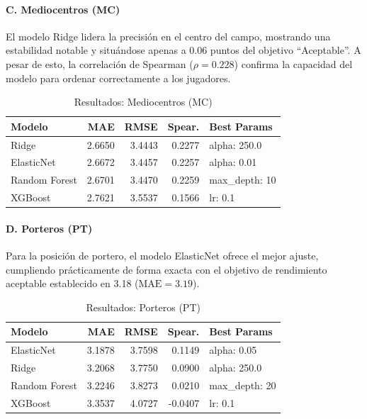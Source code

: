 \paragraph{C. Mediocentros (MC)}

El modelo Ridge lidera la precisión en el centro del campo, 
mostrando una estabilidad notable y situándose apenas a 0.06 
puntos del objetivo ``Aceptable''. A pesar de esto, la correlación 
de Spearman ($\rho = 0.228$) confirma la capacidad del modelo 
para ordenar correctamente a los jugadores.

\begin{table}[H]
\centering
\small
\begin{tabular}{|l|r|r|r|p{3cm}|}
\hline
\textbf{Modelo} & \textbf{MAE} & \textbf{RMSE} & \textbf{Spear.} & 
\textbf{Best Params} \\
\hline
Ridge & 2.6650 & 3.4443 & 0.2277 & alpha: 250.0 \\
ElasticNet & 2.6672 & 3.4457 & 0.2257 & alpha: 0.01 \\
Random Forest & 2.6701 & 3.4470 & 0.2259 & max\_depth: 10 \\
XGBoost & 2.7621 & 3.5537 & 0.1566 & lr: 0.1 \\
\hline
\end{tabular}
\caption{Resultados: Mediocentros (MC)}
\end{table}


\paragraph{D. Porteros (PT)}

Para la posición de portero, el modelo ElasticNet ofrece el mejor 
ajuste, cumpliendo prácticamente de forma exacta con el objetivo 
de rendimiento aceptable establecido en 3.18 
($\text{MAE} = 3.19$).

\begin{table}[H]
\centering
\small
\begin{tabular}{|l|r|r|r|p{3cm}|}
\hline
\textbf{Modelo} & \textbf{MAE} & \textbf{RMSE} & \textbf{Spear.} & 
\textbf{Best Params} \\
\hline
ElasticNet & 3.1878 & 3.7598 & 0.1149 & alpha: 0.05 \\
Ridge & 3.2068 & 3.7750 & 0.0900 & alpha: 250.0 \\
Random Forest & 3.2246 & 3.8273 & 0.0210 & max\_depth: 20 \\
XGBoost & 3.3537 & 4.0727 & -0.0407 & lr: 0.1 \\
\hline
\end{tabular}
\caption{Resultados: Porteros (PT)}
\end{table}


